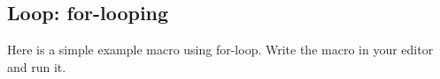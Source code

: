 \subsection{Loop: for-looping}
Here is a simple example macro using for-loop. Write the macro in your editor and run it.